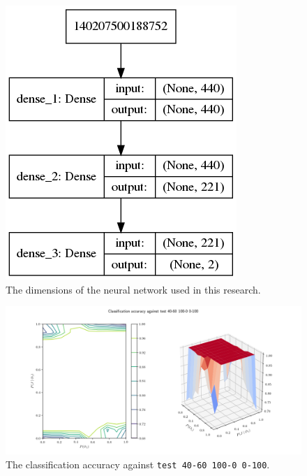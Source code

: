 \documentclass{report}
\newcommand{\code}{\texttt}
\begin{document}
\begin{figure}[h]
    \centering
    \includegraphics[scale=0.5]{figures/neural_network_model.png}
    \caption[]{The dimensions of the neural network used in this research.}
    \label{fig:neural_network_model}
\end{figure}

% 
% 

\begin{figure}[h]
    \centering
    \centerline{\includegraphics[scale=0.55]{test_40-60_100-0_0-100_accuracy.png}}
    \caption[]{The classification accuracy against \code{test 40-60 100-0 0-100}.}
    \label{fig:test_40-60_100-0_0-100_accuracy_plot}
\end{figure}
\end{document}

